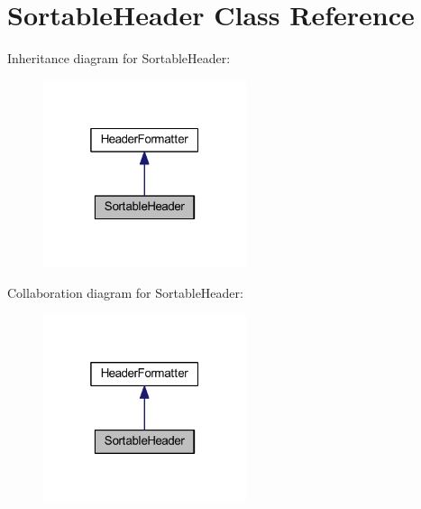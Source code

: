 \hypertarget{classhamburgscleanest_1_1_data_tables_1_1_models_1_1_header_formatters_1_1_sortable_header}{}\section{Sortable\+Header Class Reference}
\label{classhamburgscleanest_1_1_data_tables_1_1_models_1_1_header_formatters_1_1_sortable_header}


Inheritance diagram for Sortable\+Header\+:
\nopagebreak
\begin{figure}[H]
\begin{center}
\leavevmode
\includegraphics[width=169pt]{classhamburgscleanest_1_1_data_tables_1_1_models_1_1_header_formatters_1_1_sortable_header__inherit__graph}
\end{center}
\end{figure}


Collaboration diagram for Sortable\+Header\+:
\nopagebreak
\begin{figure}[H]
\begin{center}
\leavevmode
\includegraphics[width=169pt]{classhamburgscleanest_1_1_data_tables_1_1_models_1_1_header_formatters_1_1_sortable_header__coll__graph}
\end{center}
\end{figure}
